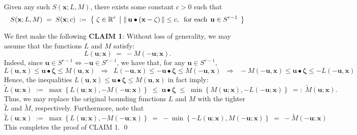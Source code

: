 \begin{proposition}\quad
Given any such $S(\mathbf{x};L,M)$, there exists some constant $c > 0$ such that
\begin{equation*}
S(\mathbf{x};L,M) \; = \; S(\mathbf{x};c) \; := \;
\left\{\;
\zeta \in \Re^{r}
\;\left\vert\;
\Vert\,\mathbf{u} \bullet (\mathbf{x} - \mathbf{\zeta})\,\Vert
\leq c,
\;\;
\textnormal{for each}\;\, \mathbf{u} \in S^{r-1}
\right.
\;\right\}
\end{equation*}
\end{proposition}
\proof
We first make the following
\vskip 0.5cm
\noindent
\textbf{CLAIM 1}: Without loss of generality, we may assume that the functions $L$ and $M$ satisfy:
\begin{equation*}
L(\mathbf{u};\mathbf{x}) \; = \; -M(-\mathbf{u};\mathbf{x}).
\end{equation*}
Indeed, since $\mathbf{u} \in S^{r-1} \Longleftrightarrow -\mathbf{u} \in S^{r-1}$, we have that,
for any $\mathbf{u} \in S^{r-1}$,
\begin{equation*}
L(\mathbf{u},\mathbf{x}) \leq \mathbf{u} \bullet \mathbf{\zeta} \leq M(\mathbf{u},\mathbf{x})
\;\;\Longrightarrow\;\;
L(-\mathbf{u},\mathbf{x}) \leq -\mathbf{u} \bullet \mathbf{\zeta} \leq M(-\mathbf{u},\mathbf{x})
\;\;\Longrightarrow\;\;
-M(-\mathbf{u},\mathbf{x}) \leq \mathbf{u} \bullet \mathbf{\zeta} \leq -L(-\mathbf{u},\mathbf{x})
\end{equation*}
Hence, the inequalities
$L(\mathbf{u},\mathbf{x}) \leq \mathbf{u} \bullet \mathbf{\zeta} \leq M(\mathbf{u},\mathbf{x})$
in fact imply:
\begin{equation*}
\widetilde{L}(\mathbf{u};\mathbf{x}) \; := \;\max\left\{L(\mathbf{u};\mathbf{x}),-M(-\mathbf{u};\mathbf{x})\right\}
\; \leq \; \mathbf{u} \bullet \mathbf{\zeta} \; \leq \;
\min\left\{M(\mathbf{u};\mathbf{x}),-L(-\mathbf{u};\mathbf{x})\right\} \; =: \; \widetilde{M}(\mathbf{u};\mathbf{x}).
\end{equation*}
Thus, we may replace the original bounding functions $L$ and $M$ with the tighter
$\widetilde{L}$ and $\widetilde{M}$, respectively.  Furthermore, note that
\begin{equation*}
\widetilde{L}(\mathbf{u};\mathbf{x})
\; := \;
\max\left\{ L(\mathbf{u};\mathbf{x}),-M(-\mathbf{u};\mathbf{x}) \right\}
\;  = \;
- \min\left\{ -L(\mathbf{u};\mathbf{x}),M(-\mathbf{u};\mathbf{x}) \right\}
\;  = \;
- \widetilde{M}(-\mathbf{u};\mathbf{x})
\end{equation*}
This completes the proof of CLAIM 1.
\qed
